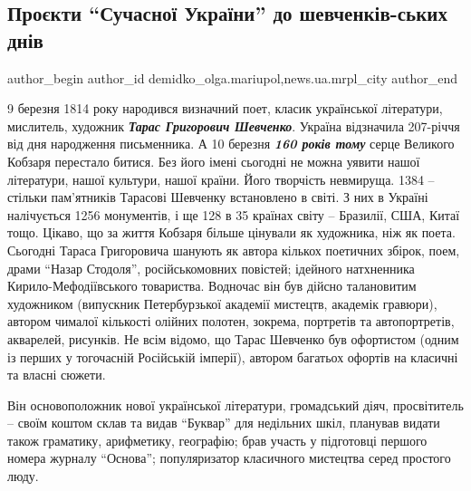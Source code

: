  
 
 
 
 
 
\subsection{Проєкти \enquote{Сучасної України} до шевченків\hyp{}ських днів}
\label{sec:11_03_2021.stz.news.ua.mrpl_city.1.proekty_suchasnoj_ukrainy_shevchenko_dni}
 
\ifcmt
 author_begin
   author_id demidko_olga.mariupol,news.ua.mrpl_city
 author_end
\fi

9 березня 1814 року народився визначний поет, класик української літератури,
мислитель, художник \emph{\textbf{Тарас Григорович Шевченко}}. Україна відзначила 207-річчя від
дня народження письменника. А 10 березня \emph{\textbf{160 років тому}} серце Великого Кобзаря
перестало битися. Без його імені сьогодні не можна уявити нашої літератури,
нашої культури, нашої країни. Його творчість невмируща. 1384 – стільки
пам'ятників Тарасові Шевченку встановлено в світі. З них в Україні налічується
1256 монументів, і ще 128 в 35 країнах світу – Бразилії, США, Китаї тощо.
Цікаво, що за життя Кобзаря більше цінували як художника, ніж як поета.
Сьогодні Тараса Григоровича шанують як автора кількох поетичних збірок, поем,
драми \enquote{Назар Стодоля}, російськомовних повістей; ідейного натхненника
Кирило-Мефодіївського товариства. Водночас він був дійсно талановитим
художником (випускник Петербурзької академії мистецтв, академік гравюри),
автором чималої кількості олійних полотен, зокрема, портретів та автопортретів,
акварелей, рисунків. Не всім відомо, що Тарас Шевченко був офортистом (одним із
перших у тогочасній Російській імперії), автором багатьох офортів на класичні
та власні сюжети.


Він основоположник нової української літератури, громадський діяч,
просвітитель – своїм коштом склав та видав \enquote{Буквар} для недільних шкіл,
планував видати також граматику, арифметику, географію; брав участь у
підготовці першого номера журналу \enquote{Основа}; популяризатор класичного мистецтва
серед простого люду.

